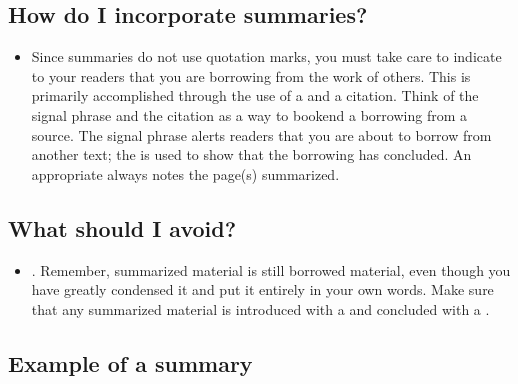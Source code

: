 \subsection{How do I incorporate summaries?}

\begin{itemize}
\item Since summaries do not use quotation marks, you must take care to
indicate to your readers that you are borrowing from the work of others. This is primarily accomplished
through the use of a \hyperlink{signalphrase}{\color{Ahrenge}{signal phrase}} and a citation. Think of the signal phrase and the citation as a way to bookend a borrowing from a source. The signal phrase alerts readers that you are about to borrow from another text; the \hyperlink{citation}{\color{Ahrenge}{citation}} is used to show that the borrowing has concluded. An appropriate \hyperlink{citation}{\color{Ahrenge}{citation}} always notes the page(s) summarized.
\end{itemize}

\subsection{What should I avoid?}
\begin{itemize}

\item {}. Remember, summarized material
is still borrowed material, even though you have greatly condensed it and
put it entirely in your own words. Make sure that any summarized material is 
introduced with a \hyperlink{signalphrase}{\color{Ahrenge}{signal phrase}} and concluded with a \hyperlink{citation}{\color{Ahrenge}{citation}}.
\end{itemize}


\subsection{Example of a summary}


